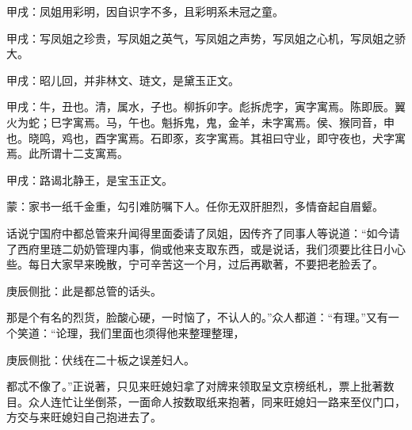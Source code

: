 
\begin{parag}
    \begin{note}甲戌：凤姐用彩明，因自识字不多，且彩明系未冠之童。\end{note}
\end{parag}


\begin{parag}
    \begin{note}甲戌：写凤姐之珍贵，写凤姐之英气，写凤姐之声势，写凤姐之心机，写凤姐之骄大。\end{note}
\end{parag}


\begin{parag}
    \begin{note}甲戌：昭儿回，并非林文、琏文，是黛玉正文。\end{note}
\end{parag}


\begin{parag}
    \begin{note}甲戌：牛，丑也。清，属水，子也。柳拆卯字。彪拆虎字，寅字寓焉。陈即辰。翼火为蛇；巳字寓焉。马，午也。魁拆鬼，鬼，金羊，未字寓焉。侯、猴同音，申也。晓鸣，鸡也，酉字寓焉。石即豕，亥字寓焉。其祖曰守业，即守夜也，犬字寓焉。此所谓十二支寓焉。\end{note}
\end{parag}


\begin{parag}
    \begin{note}甲戌：路谒北静王，是宝玉正文。\end{note}
\end{parag}


\begin{parag}
    \begin{note}蒙：家书一纸千金重，勾引难防嘱下人。任你无双肝胆烈，多情奋起自眉颦。\end{note}
\end{parag}


\begin{parag}
    话说宁国府中都总管来升闻得里面委请了凤姐，因传齐了同事人等说道：“如今请了西府里琏二奶奶管理内事，倘或他来支取东西，或是说话，我们须要比往日小心些。每日大家早来晚散，宁可辛苦这一个月，过后再歇著，不要把老脸丢了。\begin{note}庚辰侧批：此是都总管的话头。\end{note}那是个有名的烈货，脸酸心硬，一时恼了，不认人的。”众人都道：“有理。”又有一个笑道：“论理，我们里面也须得他来整理整理，\begin{note}庚辰侧批：伏线在二十板之误差妇人。\end{note}都忒不像了。”正说著，只见来旺媳妇拿了对牌来领取呈文京榜纸札，票上批著数目。众人连忙让坐倒茶，一面命人按数取纸来抱著，同来旺媳妇一路来至仪门口，方交与来旺媳妇自己抱进去了。
\end{parag}


